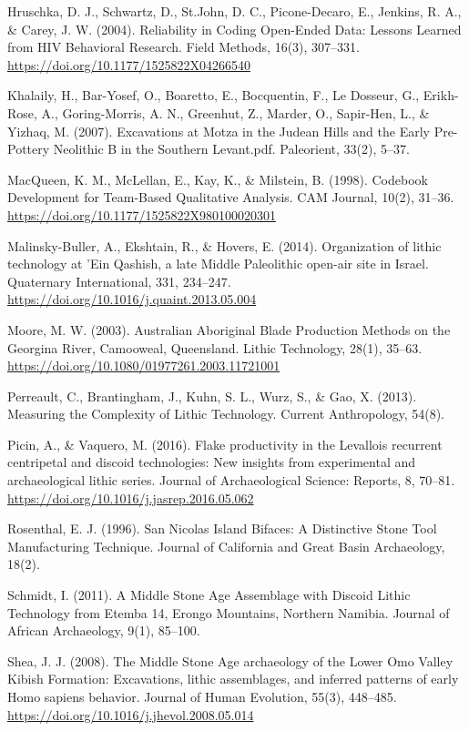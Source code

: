 \documentclass[
]{article}
\begin{document}
Hruschka, D. J., Schwartz, D., St.John, D. C., Picone-Decaro, E.,
Jenkins, R. A., \& Carey, J. W. (2004). Reliability in Coding Open-Ended
Data: Lessons Learned from HIV Behavioral Research. Field Methods,
16(3), 307--331. \url{https://doi.org/10.1177/1525822X04266540}

Khalaily, H., Bar-Yosef, O., Boaretto, E., Bocquentin, F., Le Dosseur,
G., Erikh-Rose, A., Goring-Morris, A. N., Greenhut, Z., Marder, O.,
Sapir-Hen, L., \& Yizhaq, M. (2007). Excavations at Motza in the Judean
Hills and the Early Pre-Pottery Neolithic B in the Southern Levant.pdf.
Paleorient, 33(2), 5--37.

MacQueen, K. M., McLellan, E., Kay, K., \& Milstein, B. (1998). Codebook
Development for Team-Based Qualitative Analysis. CAM Journal, 10(2),
31--36. \url{https://doi.org/10.1177/1525822X980100020301}

Malinsky-Buller, A., Ekshtain, R., \& Hovers, E. (2014). Organization of
lithic technology at 'Ein Qashish, a late Middle Paleolithic open-air
site in Israel. Quaternary International, 331, 234--247.
\url{https://doi.org/10.1016/j.quaint.2013.05.004}

Moore, M. W. (2003). Australian Aboriginal Blade Production Methods on
the Georgina River, Camooweal, Queensland. Lithic Technology, 28(1),
35--63. \url{https://doi.org/10.1080/01977261.2003.11721001}

Perreault, C., Brantingham, J., Kuhn, S. L., Wurz, S., \& Gao, X.
(2013). Measuring the Complexity of Lithic Technology. Current
Anthropology, 54(8).

Picin, A., \& Vaquero, M. (2016). Flake productivity in the Levallois
recurrent centripetal and discoid technologies: New insights from
experimental and archaeological lithic series. Journal of Archaeological
Science: Reports, 8, 70--81.
\url{https://doi.org/10.1016/j.jasrep.2016.05.062}

Rosenthal, E. J. (1996). San Nicolas Island Bifaces: A Distinctive Stone
Tool Manufacturing Technique. Journal of California and Great Basin
Archaeology, 18(2).

Schmidt, I. (2011). A Middle Stone Age Assemblage with Discoid Lithic
Technology from Etemba 14, Erongo Mountains, Northern Namibia. Journal
of African Archaeology, 9(1), 85--100.

Shea, J. J. (2008). The Middle Stone Age archaeology of the Lower Omo
Valley Kibish Formation: Excavations, lithic assemblages, and inferred
patterns of early Homo sapiens behavior. Journal of Human Evolution,
55(3), 448--485. \url{https://doi.org/10.1016/j.jhevol.2008.05.014}
\end{document}
